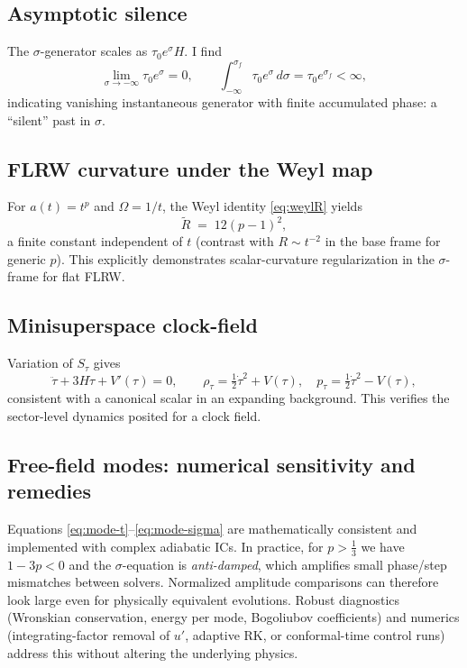\documentclass[11pt]{article}
\begin{document}
\subsection{Asymptotic silence}
The $\sigma$-generator scales as $\tau_0 e^{\sigma}H$. I find
\[
\lim_{\sigma\to -\infty}\tau_0 e^{\sigma}=0,
\qquad
\int_{-\infty}^{\sigma_f}\tau_0 e^{\sigma}\,d\sigma=\tau_0 e^{\sigma_f}<\infty,
\]
indicating vanishing instantaneous generator with finite accumulated phase: a ``silent'' past in $\sigma$.

\subsection{FLRW curvature under the Weyl map}
For $a(t)=t^p$ and $\Omega=1/t$, the Weyl identity \eqref{eq:weylR} yields
\begin{equation}
\tilde R \;=\; 12(p-1)^2,
\label{eq:RtConstant}
\end{equation}
a finite constant independent of $t$ (contrast with $R\sim t^{-2}$ in the base frame for generic $p$). This explicitly demonstrates scalar-curvature regularization in the $\sigma$-frame for flat FLRW.

\subsection{Minisuperspace clock-field}
Variation of $S_\tau$ gives
\[
\ddot\tau+3H\dot\tau+V'(\tau)=0,
\qquad
\rho_\tau=\tfrac12\dot\tau^2+V(\tau),
\quad
p_\tau=\tfrac12\dot\tau^2-V(\tau),
\]
consistent with a canonical scalar in an expanding background. This verifies the sector-level dynamics posited for a clock field.

\subsection{Free-field modes: numerical sensitivity and remedies}
Equations \eqref{eq:mode-t}--\eqref{eq:mode-sigma} are mathematically consistent and implemented with complex adiabatic ICs. In practice, for $p>\tfrac13$ we have $1-3p<0$ and the $\sigma$-equation is \emph{anti-damped}, which amplifies small phase/step mismatches between solvers. Normalized amplitude comparisons can therefore look large even for physically equivalent evolutions. Robust diagnostics (Wronskian conservation, energy per mode, Bogoliubov coefficients) and numerics (integrating-factor removal of $u'$, adaptive RK, or conformal-time control runs) address this without altering the underlying physics.
\end{document}
